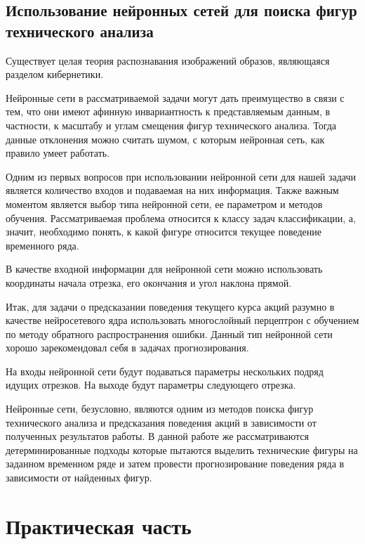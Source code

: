 \documentclass[bachelor, och, coursework]{SCWorks}
\begin{document}
        \subsection{Использование нейронных сетей для поиска фигур технического анализа}
        Существует целая теория распознавания изображений образов, являющаяся 
        разделом кибернетики.

        Нейронные сети в рассматриваемой задачи могут дать преимущество в связи 
        с тем, что они имеют афинную инвариантность к представляемым данным, в
        частности, к масштабу и углам смещения фигур технического анализа. Тогда
        данные отклонения можно считать шумом, с которым нейронная сеть, как
        правило умеет работать. 

        Одним из первых вопросов при использовании нейронной сети для нашей задачи
        является количество входов и подаваемая на них информация. Также важным 
        моментом является выбор типа нейронной сети, ее параметром и методов
        обучения. Рассматриваемая проблема относится к классу задач классификации, 
        а, значит, необходимо понять, к какой фигуре относится текущее поведение
        временного ряда.

        В качестве входной информации для нейронной сети можно использовать
        координаты начала отрезка, его окончания и угол наклона прямой. 

        Итак, для задачи о предсказании поведения текущего курса акций разумно
        в качестве нейросетевого ядра использовать многослойный перцептрон с
        обучением по методу обратного распространения ошибки. Данный тип нейронной
        сети хорошо зарекомендовал себя в задачах прогнозирования.

        На входы нейронной сети будут подаваться параметры нескольких подряд
        идущих отрезков. На выходе будут параметры следующего отрезка.
        
        Нейронные сети, безусловно, являются одним из методов поиска фигур
        технического анализа и предсказания поведения акций в зависимости от
        полученных результатов работы. В данной работе же рассматриваются 
        детерминированные подходы которые пытаются выделить технические фигуры
        на заданном временном ряде и затем провести прогнозирование поведения ряда
        в зависимости от найденных фигур.


\section{Практическая часть}
\end{document}
